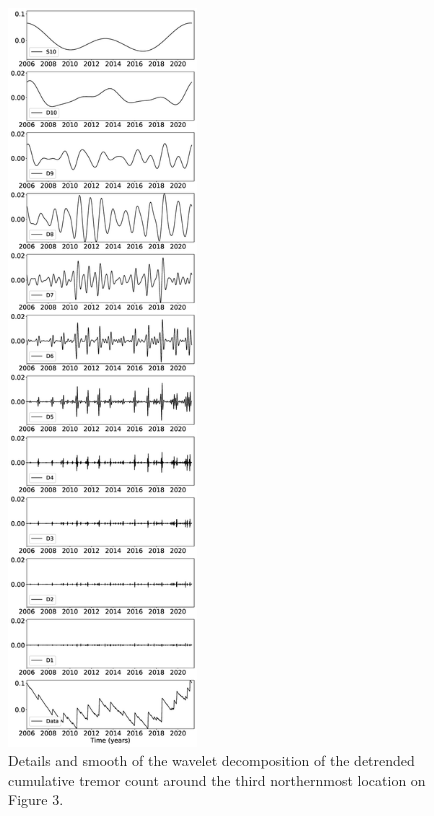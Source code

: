 \documentclass{article}
\begin{document}
\begin{figure}
\noindent\includegraphics[width=5cm, trim={0cm 0cm 0cm 0cm},clip]{figures/tremor_13.eps}
\caption{Details and smooth of the wavelet decomposition of the detrended cumulative tremor count around the third northernmost location on Figure 3.}
\label{pngfiguresample}
\end{figure}
\end{document}
